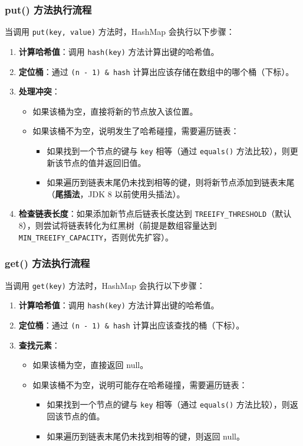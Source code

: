 \subsubsection{put() 方法执行流程}
当调用 \texttt{put(key, value)} 方法时，HashMap 会执行以下步骤：

\begin{enumerate}
    \item \textbf{计算哈希值}：调用 \texttt{hash(key)} 方法计算出键的哈希值。
    \item \textbf{定位桶}：通过 \texttt{(n - 1) \& hash} 计算出应该存储在数组中的哪个桶（下标）。
    \item \textbf{处理冲突}：
    \begin{itemize}
        \item 如果该桶为空，直接将新的节点放入该位置。
        \item 如果该桶不为空，说明发生了哈希碰撞，需要遍历链表：
        \begin{itemize}
            \item 如果找到一个节点的键与 \texttt{key} 相等（通过 \texttt{equals()} 方法比较），则更新该节点的值并返回旧值。
            \item 如果遍历到链表末尾仍未找到相等的键，则将新节点添加到链表末尾（\textbf{尾插法}，JDK 8 以前使用头插法）。
        \end{itemize}
    \end{itemize}
    \item \textbf{检查链表长度}：如果添加新节点后链表长度达到 \texttt{TREEIFY\_THRESHOLD}（默认 8），则尝试将链表转化为红黑树（前提是数组容量达到 \texttt{MIN\_TREEIFY\_CAPACITY}，否则优先扩容）。
\end{enumerate}

\subsubsection{get() 方法执行流程}
当调用 \texttt{get(key)} 方法时，HashMap 会执行以下步骤：

\begin{enumerate}
    \item \textbf{计算哈希值}：调用 \texttt{hash(key)} 方法计算出键的哈希值。
    \item \textbf{定位桶}：通过 \texttt{(n - 1) \& hash} 计算出应该查找的桶（下标）。
    \item \textbf{查找元素}：
    \begin{itemize}
        \item 如果该桶为空，直接返回 null。
        \item 如果该桶不为空，说明可能存在哈希碰撞，需要遍历链表：
        \begin{itemize}
            \item 如果找到一个节点的键与 \texttt{key} 相等（通过 \texttt{equals()} 方法比较），则返回该节点的值。
            \item 如果遍历到链表末尾仍未找到相等的键，则返回 null。
        \end{itemize}
    \end{itemize}
\end{enumerate}

